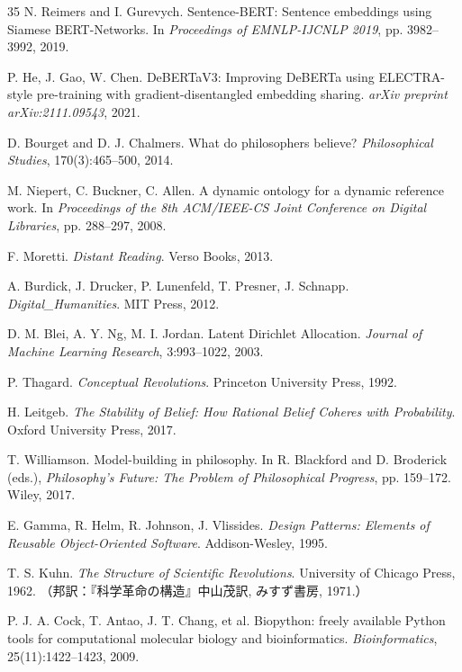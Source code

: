\documentclass[a4paper,11pt]{ltjsarticle}
\begin{document}
\begin{thebibliography}{35}
 N. Reimers and I. Gurevych. Sentence-BERT: Sentence embeddings using Siamese BERT-Networks. In \textit{Proceedings of EMNLP-IJCNLP 2019}, pp. 3982--3992, 2019.

 P. He, J. Gao, W. Chen. DeBERTaV3: Improving DeBERTa using ELECTRA-style pre-training with gradient-disentangled embedding sharing. \textit{arXiv preprint arXiv:2111.09543}, 2021.

 D. Bourget and D. J. Chalmers. What do philosophers believe? \textit{Philosophical Studies}, 170(3):465--500, 2014.

 M. Niepert, C. Buckner, C. Allen. A dynamic ontology for a dynamic reference work. In \textit{Proceedings of the 8th ACM/IEEE-CS Joint Conference on Digital Libraries}, pp. 288--297, 2008.

 F. Moretti. \textit{Distant Reading}. Verso Books, 2013.

 A. Burdick, J. Drucker, P. Lunenfeld, T. Presner, J. Schnapp. \textit{Digital\_Humanities}. MIT Press, 2012.

 D. M. Blei, A. Y. Ng, M. I. Jordan. Latent Dirichlet Allocation. \textit{Journal of Machine Learning Research}, 3:993--1022, 2003.

 P. Thagard. \textit{Conceptual Revolutions}. Princeton University Press, 1992.

 H. Leitgeb. \textit{The Stability of Belief: How Rational Belief Coheres with Probability}. Oxford University Press, 2017.

 T. Williamson. Model-building in philosophy. In R. Blackford and D. Broderick (eds.), \textit{Philosophy's Future: The Problem of Philosophical Progress}, pp. 159--172. Wiley, 2017.

 E. Gamma, R. Helm, R. Johnson, J. Vlissides. \textit{Design Patterns: Elements of Reusable Object-Oriented Software}. Addison-Wesley, 1995.

 T. S. Kuhn. \textit{The Structure of Scientific Revolutions}. University of Chicago Press, 1962. （邦訳：『科学革命の構造』中山茂訳, みすず書房, 1971.）

 P. J. A. Cock, T. Antao, J. T. Chang, et al. Biopython: freely available Python tools for computational molecular biology and bioinformatics. \textit{Bioinformatics}, 25(11):1422--1423, 2009.


\end{thebibliography}
\end{document}
